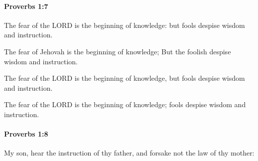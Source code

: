 		\paragraph{Proverbs 1:7} %
			\label{PROVERBS-1-7}

			The fear of the LORD is the beginning of knowledge: but fools despise wisdom and instruction.

			\begin{versebox}
					\item[BHS] 
					\item[ASV] The fear of Jehovah is the beginning of knowledge; But the foolish despise wisdom and instruction.
					\item[NIV] The fear of the LORD is the beginning of knowledge, but fools despise wisdom and instruction.
					\item[NRSV] The fear of the LORD is the beginning of knowledge; fools despise wisdom and instruction.
			\end{versebox}

		\paragraph{Proverbs 1:8} %
			\label{PROVERBS-1-8}

			My son, hear the instruction of thy father, and forsake not the law of thy mother:

